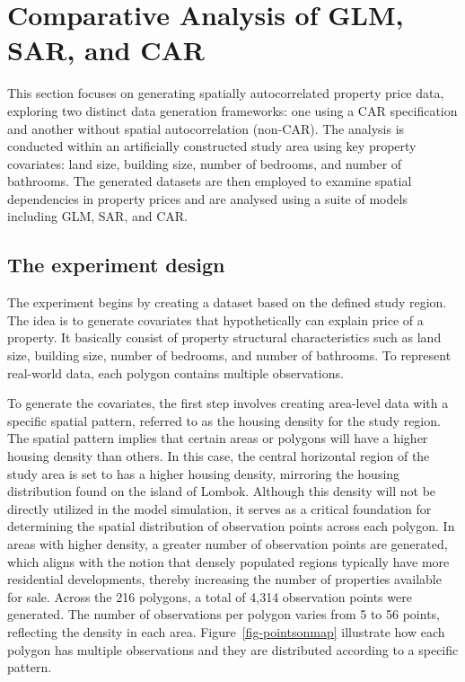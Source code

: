 \documentclass[
  default,
]{sn-jnl}
\begin{document}
\endgroup{}

\section{Comparative Analysis of GLM, SAR, and
CAR}\label{comparative-analysis-of-glm-sar-and-car}

This section focuses on generating spatially autocorrelated property
price data, exploring two distinct data generation frameworks: one using
a CAR specification and another without spatial autocorrelation
(non-CAR). The analysis is conducted within an artificially constructed
study area using key property covariates: land size, building size,
number of bedrooms, and number of bathrooms. The generated datasets are
then employed to examine spatial dependencies in property prices and are
analysed using a suite of models including GLM, SAR, and CAR.

\subsection{The experiment design}\label{the-experiment-design}

The experiment begins by creating a dataset based on the defined study
region. The idea is to generate covariates that hypothetically can
explain price of a property. It basically consist of property structural
characteristics such as land size, building size, number of bedrooms,
and number of bathrooms. To represent real-world data, each polygon
contains multiple observations.

To generate the covariates, the first step involves creating area-level
data with a specific spatial pattern, referred to as the housing density
for the study region. The spatial pattern implies that certain areas or
polygons will have a higher housing density than others. In this case,
the central horizontal region of the study area is set to has a higher
housing density, mirroring the housing distribution found on the island
of Lombok. Although this density will not be directly utilized in the
model simulation, it serves as a critical foundation for determining the
spatial distribution of observation points across each polygon. In areas
with higher density, a greater number of observation points are
generated, which aligns with the notion that densely populated regions
typically have more residential developments, thereby increasing the
number of properties available for sale. Across the 216 polygons, a
total of 4,314 observation points were generated. The number of
observations per polygon varies from 5 to 56 points, reflecting the
density in each area. Figure~\ref{fig-pointsonmap} illustrate how each
polygon has multiple observations and they are distributed according to
a specific pattern.
\end{document}
